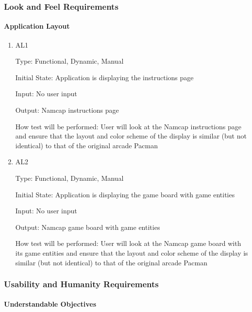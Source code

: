 \documentclass[12pt, titlepage]{article}
\begin{document}
\subsubsection{Look and Feel Requirements}
		
\paragraph{Application Layout}

\begin{enumerate}

\item{AL1\\}

Type: Functional, Dynamic, Manual
					
Initial State: Application is displaying the instructions page
					
Input: No user input
					
Output: Namcap instructions page
					
How test will be performed: User will look at the Namcap instructions page and ensure that the layout and color scheme of the display is similar (but not identical) to that of the original arcade Pacman
					
\item{AL2\\}

Type: Functional, Dynamic, Manual
					
Initial State: Application is displaying the game board with game entities
					
Input: No user input
					
Output: Namcap game board with game entities
					
How test will be performed: User will look at the Namcap game board with its game entities and ensure that the layout and color scheme of the display is similar (but not identical) to that of the original arcade Pacman

\end{enumerate}

\subsubsection{Usability and Humanity Requirements}

\paragraph{Understandable Objectives}
\end{document}
